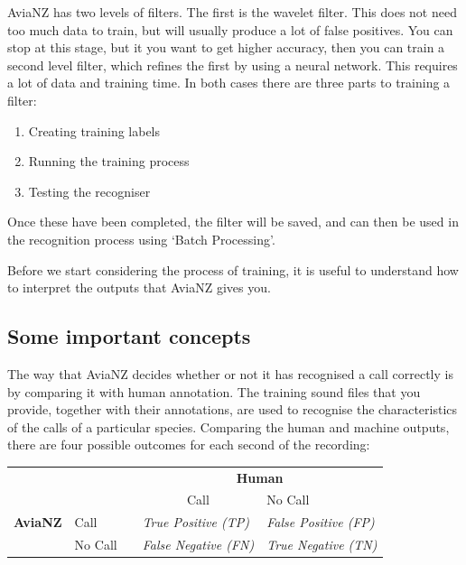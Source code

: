 \documentclass{article}
\begin{document}
AviaNZ has two levels of filters. The first is the wavelet filter. This does not need too much data to train, but will usually produce a lot of false positives. You can stop at this stage, but it you want to get higher accuracy, then you can train a second level filter, which refines the first by using a neural network. This requires a lot of data and training time. In both cases there are three parts to training a filter:

\begin{enumerate}
\item Creating training labels
\item Running the training process
\item Testing the recogniser
\end{enumerate}

Once these have been completed, the filter will be saved, and can then be used in the recognition process using `Batch Processing'. 

Before we start considering the process of training, it is useful to understand how to interpret the outputs that AviaNZ gives you. 

\subsection{Some important concepts}\label{sec:metrics}

The way that AviaNZ decides whether or not it has recognised a call correctly is by comparing it with human annotation. The training sound files that you provide, together with their annotations, are used to recognise the characteristics of the calls of a particular species. Comparing the human and machine outputs, there are four possible outcomes for each second of the recording:

\begin{center}
\begin{tabular}{lllll}
&          &  & \multicolumn{2}{c}{\textbf{Human}}   \\
\cmidrule(lr){4-5}
             &          &  & \multicolumn{1}{c}{Call}                                               & No Call                                                               \\
 \textbf{AviaNZ}                  &\vline \hspace{0.25cm}Call     &  & \textit{True Positive (TP)}  & \textit{False Positive (FP)} \\
                  &\vline \hspace{0.25cm}No Call &  & \textit{False Negative (FN)} & \textit{True Negative (TN)}  \\
\end{tabular}
\end{center}
\end{document}
